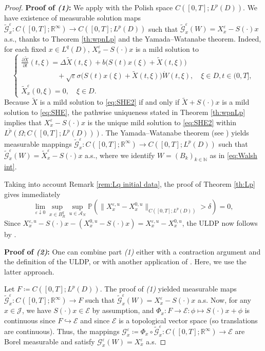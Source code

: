 \documentclass[10pt,a4paper]{amsart}
\numberwithin{equation}{section}
\newcommand{\N}{\mathbb{N}}
\newcommand{\R}{\mathbb{R}}
\newcommand{\ceqq}{\coloneqq}
\newcommand{\col}{\colon}
\renewcommand{\P}{{\mathbb P}}
\newcommand{\eps}{\varepsilon}
\newcommand{\G}{\mathcal{G}}
\newcommand{\Om}{\Omega}
\newcommand{\A}{{\mathcal A}}
\newcommand{\into}{\hookrightarrow}
\begin{document}
\begin{proof}
\textbf{Proof of \textit{(1)}:} 
We apply \cite[Th.\ 2.13]{Salins19equivalences} with the  Polish space $C([0,T];L^p(D))$. 
We have existence of measurable solution maps $\tilde{\G}_x^\eps\col C([0,T];\R^\infty)\to C([0,T];L^p(D))$ such that $\tilde{\G}_x^\eps(W)=X_x^{\eps}-S(\cdot)x$ a.s.,  thanks to Theorem \ref{th:wpnLp} and the Yamada--Watanabe theorem. Indeed, for each fixed $x\in L^q(D)$,  $  X_x^\eps-S(\cdot)x$  is a mild solution to 
\begin{equation}\label{eq:SHE2}
\begin{cases}
\frac{\partial \tilde X}{\partial t}(t, \xi) = \Delta \tilde X(t,\xi) + b\big(S(t)x(\xi)+\tilde X(t,\xi)\big)\\
\qquad\qquad\quad+ \sqrt{\eps}  \sigma\big(S(t)x(\xi)+\tilde X(t, \xi)\big)\dot{W}(t,\xi), \quad  \xi \in D, t \in(0,T], \\ 
\tilde X_x^{\eps}(0, \xi) = 0, \quad\xi\in D.
\end{cases}  
\end{equation} 
Because $\tilde X$ is a mild solution to \eqref{eq:SHE2} if and only if $\tilde X+S(\cdot)x$ is a mild solution to \eqref{eq:SHE}, the pathwise uniqueness stated in Theorem \ref{th:wpnLp} implies that  $X_x^\eps-S(\cdot)x$ is the unique mild solution to \eqref{eq:SHE2}  within $L^{\tilde p}(\Om;C([0,T];L^p(D)))$. The Yamada--Watanabe theorem (see \cite{ondrejat}) yields measurable mappings $\tilde{\G}_x^{\eps}\col C([0,T];\R^\infty)\to C([0,T];L^p(D))$ such that $\tilde{\G}_x^{\eps}(W)=\tilde X_x^{\eps}-S(\cdot)x$ a.s., where we identify $W=(B_k)_{k\in\N}$ as in  \eqref{eq:Walsh int}.  

Taking into account Remark \ref{rem:Lq initial data}, the proof of Theorem \ref{th:Lp}    gives immediately 
\begin{equation}\label{eq:lim2}
\lim_{\eps\downarrow 0}\sup_{x\in B_R^q}\sup_{u\in\A_N}\P(\|X_x^{\eps,u}-X_x^{0,u}\|_{C([0,T];L^p(D))}>\delta)=0, 
\end{equation} Since $X_x^{\eps,u}-S(\cdot)x-(X_x^{0,u}-S(\cdot)x)=X_x^{\eps,u}-X_x^{0,u}$,  
the ULDP now follows by \cite[Th.\ 2.13]{Salins19equivalences}. 


\textbf{Proof of \textit{(2)}:} One can combine part \textit{(1)} either with a contraction argument and the definition of the ULDP, or with another application of \cite[Th.\ 3.12]{Salins19equivalences}. Here, we use the latter approach. 

Let $F\ceqq C([0,T];L^p(D))$. The proof of \textit{(1)} yielded    measurable maps 
$\tilde{\G}_x^{\eps}\col C([0,T];\R^\infty)\to F$
such that $\tilde{\G}_x^{\eps}(W)=X_x^{\eps}-S(\cdot)x$ a.s. Now, for any $x\in\mathcal{J}$, we have $S(\cdot)x\in\mathcal{E}$ by assumption, and $\Phi_x\col F\to \mathcal{E}\col \phi\mapsto S(\cdot)x+\phi$ is continuous since $F\into \mathcal{E}$ and since $\mathcal{E}$ is a topological vector space (so translations are continuous). Thus, the mappings ${\G}_x^\eps\ceqq \Phi_x\circ \tilde{\G}_x^\eps\col C([0,T];\R^\infty)\to \mathcal{E}$ are Borel measurable and satisfy $\G_x^{\eps}(W)= X_x^{\eps}$ a.s. 


\end{proof}
\end{document}
